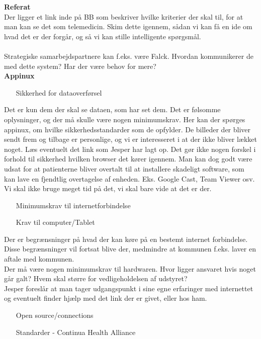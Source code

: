 \textbf{Referat} 
\\
Der ligger et link inde på BB som beskriver hvilke kriterier der skal til, for at man kan se det som telemedicin. Skim dette igennem, sådan vi kan få en ide om hvad det er der forgår, og så vi kan stille intelligente spørgsmål.\\
\\
Strategiske samarbejdspartnere kan f.eks. være Falck. Hvordan kommunikerer de med dette system? Har der være behov for mere?\\
\textbf{Appinux}
\begin{itemize}
\item[Sikkerhed for dataoverførsel]
\end{itemize}
Det er kun dem der skal se dataen, som har set dem. Det er følsomme oplysninger, og der må skulle være nogen minimumskrav. Her kan der spørges appinux, om hvilke sikkerhedsstandarder som de opfylder. De billeder der bliver sendt frem og tilbage er personlige, og vi er interesseret i at der ikke bliver lækket noget. Læs eventuelt det link som Jesper har lagt op. Det gør ikke nogen forskel i forhold til sikkerhed hvilken browser det kører igennem. Man kan dog godt være udsat for at patienterne bliver overtalt til at installere skadeligt software, som kan lave en fjendtlig overtagelse af enheden. Eks. Google Cast, Team Viewer osv. Vi skal ikke bruge meget tid på det, vi skal bare vide at det er der. \\
\begin{itemize}
\item[Minimumskrav til internetforbindelse]
\item[Krav til computer/Tablet]
\end{itemize}
Der er begrænsninger på hvad der kan køre på en bestemt internet forbindelse. Disse begrænsninger vil fortsat blive der, medmindre at kommunen f.eks. laver en aftale med kommunen. \\
Der må være nogen minimumskrav til hardwaren. Hvor ligger ansvaret hvis noget går galt? Hvem skal større for vedligeholdelsen af udstyret?\\
Jesper foreslår at man tager udgangspunkt i sine egne erfaringer med internettet og eventuelt finder hjælp med det link der er givet, eller hos ham.\\ 
\begin{itemize}
\item[Open source/connections]
\item[Standarder - Continua Health Alliance]
\end{itemize}
